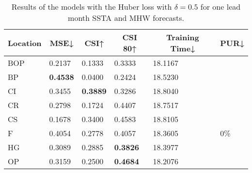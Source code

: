 \documentclass[11pt, a4paper]{article}
\begin{document}
\begin{table}[H]
\centering
\small
\caption{Results of the models with the Huber loss with $\delta=0.5$ for one lead month SSTA and MHW forecasts.}\label{tb:huber}
\begin{tabular}{llllll}
\multicolumn{1}{c}{\textbf{Location}} & \multicolumn{1}{c}{\textbf{MSE↓}} & \multicolumn{1}{c}{\textbf{CSI↑}} & \multicolumn{1}{c}{\textbf{CSI 80↑}} & \multicolumn{1}{c}{\textbf{Training Time↓}} & \multicolumn{1}{c}{\textbf{PUR↓}} \\ \hline
BOP                         & 0.2137                            & 0.1333                            & 0.3333                               & 18.1167                                     &                                   \\
BP                        & \textbf{0.4538}                   & 0.0400                            & 0.2424                               & 18.5230                                     &                                   \\
CI                        & 0.3455                            & \textbf{0.3889}                   & 0.3286                               & 18.8040                                     &                                   \\
CR                           & 0.2798                            & 0.1724                            & 0.4407                               & 18.7517                                     &                                   \\
CS                           & 0.1678                            & 0.3400                            & 0.4583                               & 18.8105                                     &                                   \\
F                             & 0.4054                            & 0.2778                            & 0.4057                               & 18.3605                                     & 0\%                               \\
HG                          & 0.3089                            & 0.2885                            & \textbf{0.3826}                      & 18.3977                                     &                                   \\
OP                       & 0.3159                            & 0.2500                            & \textbf{0.4684}                      & 18.2076                                     &                                   \\

\end{tabular}
\end{table}
\end{document}
